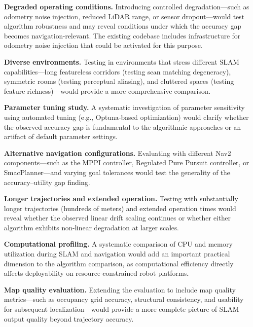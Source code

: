 \textbf{Degraded operating conditions.} Introducing controlled degradation---such as odometry noise injection, reduced LiDAR range, or sensor dropout---would test algorithm robustness and may reveal conditions under which the accuracy gap becomes navigation-relevant. The existing codebase includes infrastructure for odometry noise injection that could be activated for this purpose.

\textbf{Diverse environments.} Testing in environments that stress different SLAM capabilities---long featureless corridors (testing scan matching degeneracy), symmetric rooms (testing perceptual aliasing), and cluttered spaces (testing feature richness)---would provide a more comprehensive comparison.

\textbf{Parameter tuning study.} A systematic investigation of parameter sensitivity using automated tuning (e.g., Optuna-based optimization) would clarify whether the observed accuracy gap is fundamental to the algorithmic approaches or an artifact of default parameter settings.

\textbf{Alternative navigation configurations.} Evaluating with different Nav2 components---such as the MPPI controller, Regulated Pure Pursuit controller, or SmacPlanner---and varying goal tolerances would test the generality of the accuracy--utility gap finding.

\textbf{Longer trajectories and extended operation.} Testing with substantially longer trajectories (hundreds of meters) and extended operation times would reveal whether the observed linear drift scaling continues or whether either algorithm exhibits non-linear degradation at larger scales.

\textbf{Computational profiling.} A systematic comparison of CPU and memory utilization during SLAM and navigation would add an important practical dimension to the algorithm comparison, as computational efficiency directly affects deployability on resource-constrained robot platforms.

\textbf{Map quality evaluation.} Extending the evaluation to include map quality metrics---such as occupancy grid accuracy, structural consistency, and usability for subsequent localization---would provide a more complete picture of SLAM output quality beyond trajectory accuracy.
